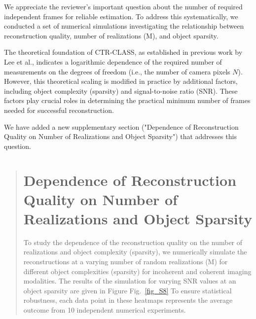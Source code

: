 \documentclass[12pt]{article}
\newcommand{\hlred}[1]{\sethlcolor{red!30}\hl{#1}}
\newenvironment{ourresponse}
    {\begin{tcolorbox}[width=\linewidth,breakable,enhanced,colback=gray!5,colframe=responsecolor!50,title=Response,left=5pt,right=5pt]}
    {\end{tcolorbox}}
\begin{document}
\begin{ourresponse}
    We appreciate the reviewer's important question about the number of required independent frames for reliable estimation. To address this systematically, we conducted a set of numerical simulations investigating the relationship between reconstruction quality, number of realizations (M), and object sparsity. 

    The theoretical foundation of CTR-CLASS, as established in previous work by Lee et al., indicates a logarithmic dependence of the required number of measurements on the degrees of freedom (i.e., the number of camera pixels $N$). However, this theoretical scaling is modified in practice by additional factors, including object complexity (sparsity) and signal-to-noise ratio (SNR). These factors play crucial roles in determining the practical minimum number of frames needed for successful reconstruction.

    We have added a new supplementary section ("Dependence of Reconstruction Quality on Number of Realizations and Object Sparsity") that addresses this question.
    
    
    \begin{quote}
        \section*{Dependence of Reconstruction Quality on Number of Realizations and Object Sparsity}


        
        To study the dependence of the reconstruction quality on the number of realizations and object complexity (sparsity), we numerically simulate the reconstructions at a varying number of random realizations (M) for different object complexities (sparsity) for incoherent and coherent imaging modalities.
        The results of the simulation for varying SNR values at an object sparsity are given in Figure Fig.~\ref{fig_S8}
        To ensure statistical robustness, each data point in these heatmaps represents the average outcome from 10 independent numerical experiments.


\end{quote}
\end{ourresponse}
\end{document}
